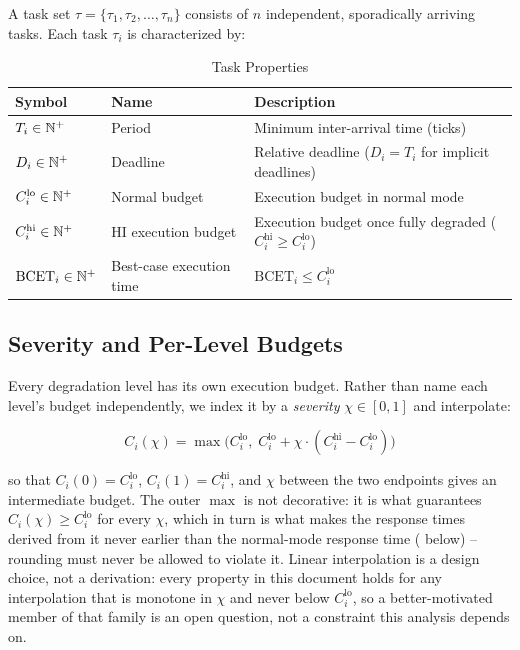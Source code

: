 \documentclass{article}
\begin{document}
A task set $\tau = \{\tau_1, \tau_2, \dots, \tau_n\}$ consists of $n$
independent, sporadically arriving tasks. Each task $\tau_i$ is characterized
by:

\begin{table}[h]
\centering
\caption{Task Properties}
\begin{tabular}{lll}
\toprule
Symbol & Name & Description \\
\midrule
$T_i \in \mathbb{N}^+$ & Period & Minimum inter-arrival time (ticks) \\
$D_i \in \mathbb{N}^+$ & Deadline & Relative deadline ($D_i = T_i$ for implicit deadlines) \\
$C_i^{\mathrm{lo}} \in \mathbb{N}^+$ & Normal budget & Execution budget in normal mode \\
$C_i^{\mathrm{hi}} \in \mathbb{N}^+$ & HI execution budget & Execution budget once fully degraded ($C_i^{\mathrm{hi}} \geq C_i^{\mathrm{lo}}$) \\
$\mathrm{BCET}_i \in \mathbb{N}^+$ & Best-case execution time & $\mathrm{BCET}_i \leq C_i^{\mathrm{lo}}$ \\
\bottomrule
\end{tabular}
\end{table}

\subsection{Severity and Per-Level Budgets}
\label{sec:severity-budgets}

Every degradation level has its own execution budget. Rather than name each
level's budget independently, we index it by a \emph{severity}
$\chi \in [0, 1]$ and interpolate:

\[
C_i(\chi) = \max\bigl(C_i^{\mathrm{lo}},\; C_i^{\mathrm{lo}} + \chi \cdot (C_i^{\mathrm{hi}} - C_i^{\mathrm{lo}})\bigr)
\]

so that $C_i(0) = C_i^{\mathrm{lo}}$, $C_i(1) = C_i^{\mathrm{hi}}$, and $\chi$
between the two endpoints gives an intermediate budget. The outer $\max$ is not
decorative: it is what guarantees $C_i(\chi) \geq C_i^{\mathrm{lo}}$ for every
$\chi$, which in turn is what makes the response times derived from it never
earlier than the normal-mode response time ( below) -- rounding
must never be allowed to violate it. Linear interpolation is a design choice,
not a derivation: every property in this document holds for any interpolation
that is monotone in $\chi$ and never below $C_i^{\mathrm{lo}}$, so a
better-motivated member of that family is an open question, not a constraint
this analysis depends on.
\end{document}

